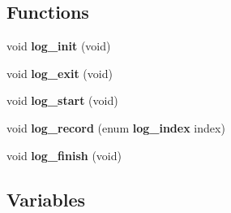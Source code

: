 \subsection*{Functions}
\begin{DoxyCompactItemize}
\item 
void \textbf{ log\+\_\+init} (void)
\item 
void \textbf{ log\+\_\+exit} (void)
\item 
void \textbf{ log\+\_\+start} (void)
\item 
void \textbf{ log\+\_\+record} (enum \textbf{ log\+\_\+index} index)
\item 
void \textbf{ log\+\_\+finish} (void)
\end{DoxyCompactItemize}
\subsection*{Variables}
